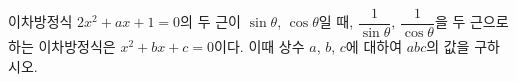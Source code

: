 이차방정식 $2x^2+ax+1=0$의 두 근이 $\sin\theta$, $\cos\theta$일 때, $\dfrac{1}{\sin\theta}$, $\dfrac{1}{\cos\theta}$을 두 근으로 하는 이차방정식은 $x^2+bx+c=0$이다. 이때 상수 $a$, $b$, $c$에 대하여 $abc$의 값을 구하시오. 
